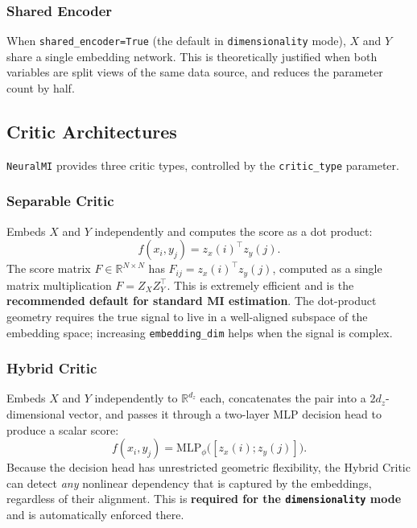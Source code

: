 \documentclass[12pt]{article}
\newcommand{\nmi}{\texttt{NeuralMI}}
\newcommand{\api}[1]{\texttt{#1}}
\newcommand{\R}{\mathbb{R}}
\begin{document}
\subsubsection{Shared Encoder}
When \api{shared\_encoder=True} (the default in \api{dimensionality} mode),
$X$ and $Y$ share a single embedding network.  This is
theoretically justified when both variables are split views of the same
data source, and reduces the parameter count by half.

\subsection{Critic Architectures}
\label{sec:arch:critics}

\nmi{} provides three critic types, controlled by the \api{critic\_type}
parameter.

\subsubsection{Separable Critic}

Embeds $X$ and $Y$ independently and computes the score as a dot product:
\begin{equation}
  f(x_i, y_j) = z_x(i)^\top z_y(j).
  \label{eq:sep}
\end{equation}
The score matrix $F \in \R^{N\times N}$ has $F_{ij} = z_x(i)^\top z_y(j)$,
computed as a single matrix multiplication $F = Z_X Z_Y^\top$.  This is
extremely efficient and is the \textbf{recommended default for standard MI
estimation}.  The dot-product geometry requires the true signal to live in
a well-aligned subspace of the embedding space; increasing
\api{embedding\_dim} helps when the signal is complex.

\subsubsection{Hybrid Critic}

Embeds $X$ and $Y$ independently to $\R^{d_z}$ each, concatenates the
pair into a $2d_z$-dimensional vector, and passes it through a two-layer
MLP decision head to produce a scalar score:
\begin{equation}
  f(x_i, y_j) = \mathrm{MLP}_\phi\bigl([z_x(i);z_y(j)]\bigr).
  \label{eq:hybrid}
\end{equation}
Because the decision head has unrestricted geometric flexibility, the
Hybrid Critic can detect \emph{any} nonlinear dependency that is captured
by the embeddings, regardless of their alignment.  This is
\textbf{required for the \api{dimensionality} mode} and is automatically
enforced there.
\end{document}
